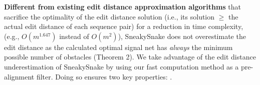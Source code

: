 
\textbf{Different from existing edit distance approximation algorithms} \citep{chakraborty2018approximating,charikar2018estimating}
that sacrifice the optimality of the edit distance solution (i.e., its solution $\geq$ the actual edit distance of each sequence pair) for a reduction in time complexity, (e.g., $O(m^{1.647})$ instead of $O(m^{2})$), SneakySnake does not overestimate the edit distance as the calculated optimal signal net has \emph{always} the minimum possible number of obstacles (Theorem 2).
{We {take advantage of} the edit distance underestimation of SneakySnake by using our fast computation method as a pre-alignment filter}.
{Doing so} {ensures} two key properties: .

